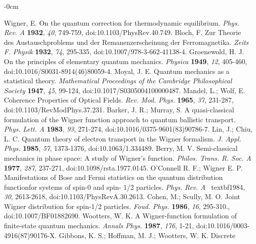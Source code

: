 \documentclass[quantumrep,article,submit,pdftex,moreauthors]{Definitions/mdpi}
\begin{document}
\begin{adjustwidth}{-\extralength}{0cm}
\begin{thebibliography}{999}
 Wigner, E. On the quantum correction for thermodynamic
equilibrium. \textit{Phys. Rev. A} \textbf{1932}, \textit{40}, 749-759,
doi:10.1103/PhysRev.40.749.
 Bloch, F. Zur Theorie des Austauschproblems und der
Remanenzerscheinung der Ferromagnetika. \textit{Zeits F. Physik} \textbf{1932},
\textit{74}, 295-335, doi:10.1007/978-3-662-41138-4.
 Groenewold, H. J. On the principles of elementary
quantum mechanics. \textit{Physica} \textbf{1949}, \textit{12}, 405-460,
doi:10.1016/S0031-8914(46)80059-4.
 Moyal, J. E. Quantum mechanics as a statistical theory. 
\textit{Mathematical Proceedings of the Cambridge Philosophical Society} 
\textbf{1947}, \textit{45}, 99-124, doi:10.1017/S0305004100000487.
 Mandel, L.; Wolf, E. Coherence Properties of Optical
Fields. \textit{Rev. Mod. Phys.} \textbf{1965}, \textit{37}, 231-287,
doi:10.1103/RevModPhys.37.231.
 Barker, J. R.; Murray, S. A quasi-classical formulation
of the Wigner function approach to quantum ballistic transport. \textit{Phys.
Lett. A} \textbf{1983}, \textit{93}, 271-274, doi:10.1016/0375-9601(83)90786-7.
 Lin, J.; Chiu, L. C. Quantum theory of electron
transport in the Wigner formalism. \textit{J. Appl. Phys.} \textbf{1985}, 
\textit{57}, 1373-1376, doi:10.1063/1.334489.
 Berry, M. V. Semi-classical mechanics in phase space: A
study of Wigner's function. \textit{Philos. Trans. R. Soc. A} \textbf{1977}, 
\textit{287}, 237-271, doi:10.1098/rsta.1977.0145.
 O'Connell R. F.; Wigner E. P. Manifestations of Bose and
Fermi statistics on the quantum distribution functionfor systems of spin-0
and spin- 1/2 particles. \textit{Phys. Rev. A} \ textbf{1984}, \textit{30},
2613-2618, doi:10.1103/PhysRevA.30.2613.
 Cohen, M.; Scully, M. O. Joint Wigner distribution for
spin-1/2 particles. \textit{Foud. Phys.} \textbf{1986}, \textit{16},
295-310., doi:10.1007/BF01882690.
 Wootters, W. K. A Wigner-function formulation of
finite-state quantum mechanics. \textit{Annals Phys.} \textbf{1987},
\textit{176}, 1-21, doi:10.1016/0003-4916(87)90176-X.
 Gibbons, K. S.; Hoffman, M. J.; Wootters, W. K. Discrete

\end{thebibliography}
\end{adjustwidth}
\end{document}
